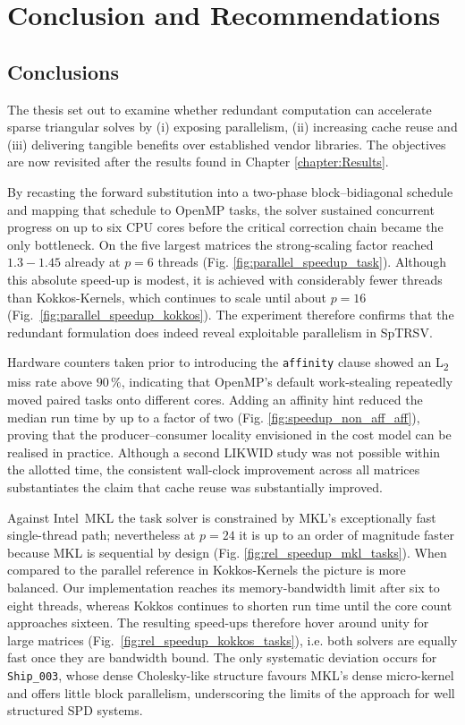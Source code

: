 \chapter{Conclusion and Recommendations}
\label{chapter:conclusion}

\section{Conclusions}
The thesis set out to examine whether redundant computation can
accelerate sparse triangular solves by (i) exposing parallelism,
(ii) increasing cache reuse and (iii) delivering tangible benefits
over established vendor libraries.  
The objectives are now revisited after the results found in Chapter \ref{chapter:Results}. 

By recasting the forward substitution into a two-phase
block–bidiagonal schedule and mapping that schedule to OpenMP tasks,
the solver sustained concurrent progress on up to six CPU cores before
the critical correction chain became the only bottleneck.
On the five largest matrices the strong-scaling factor reached
$1.3-1.45$ already at $p=6$ threads
(Fig. \ref{fig:parallel_speedup_task}).  
Although this absolute speed-up is modest, it is achieved with
considerably fewer threads than Kokkos-Kernels, which continues to
scale until about $p=16$ (Fig.~\ref{fig:parallel_speedup_kokkos}).
The experiment therefore confirms that the redundant formulation does
indeed reveal exploitable parallelism in SpTRSV.

Hardware counters taken prior to introducing the \texttt{affinity}
clause showed an L\textsubscript{2} miss rate above $90\,\%$,
indicating that OpenMP’s default work-stealing repeatedly moved paired
tasks onto different cores.  
Adding an affinity hint reduced the median run time by up to
a factor of two (Fig. \ref{fig:speedup_non_aff_aff}), proving that the
producer–consumer locality envisioned in the cost model can be
realised in practice.  Although a second LIKWID study was not possible
within the allotted time, the consistent wall-clock improvement across
all matrices substantiates the claim that cache reuse was
substantially improved.

Against Intel~MKL the task solver is constrained by MKL’s exceptionally
fast single-thread path; nevertheless at $p=24$ it is up to an order
of magnitude faster because MKL is sequential by design
(Fig. \ref{fig:rel_speedup_mkl_tasks}).  
When compared to the parallel reference in Kokkos-Kernels the picture
is more balanced.  
Our implementation reaches its memory-bandwidth limit after six to
eight threads, whereas Kokkos continues to shorten run time until the
core count approaches sixteen.  The resulting speed-ups therefore
hover around unity for large matrices
(Fig.~\ref{fig:rel_speedup_kokkos_tasks}), i.e. both solvers are
equally fast once they are bandwidth bound.  
The only systematic deviation occurs for \texttt{Ship\_003}, whose
dense Cholesky-like structure favours MKL’s dense micro-kernel and
offers little block parallelism, underscoring the limits of the
approach for well structured SPD systems.

